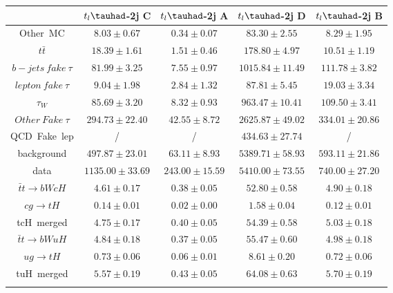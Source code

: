 \centering
\begin{tabular}{ccccc} \toprule\toprule
 & $t_{l}\tauhad$-2j C & $t_{l}\tauhad$-2j A & $t_{l}\tauhad$-2j D & $t_{l}\tauhad$-2j B\\\midrule
Other~MC & $8.03\pm0.67$ & $0.34\pm0.07$ & $83.30\pm2.55$ & $8.29\pm1.95$\\
$t\bar{t}$ & $18.39\pm1.61$ & $1.51\pm0.46$ & $178.80\pm4.97$ & $10.51\pm1.19$\\
$b-jets~fake~\tau$ & $81.99\pm3.25$ & $7.55\pm0.97$ & $1015.84\pm11.49$ & $111.78\pm3.82$\\
$lepton~fake~\tau$ & $9.04\pm1.98$ & $2.84\pm1.32$ & $87.81\pm5.45$ & $19.03\pm3.34$\\
$\tau_{W}$ & $85.69\pm3.20$ & $8.32\pm0.93$ & $963.47\pm10.41$ & $109.50\pm3.41$\\
$Other~Fake~\tau$ & $294.73\pm22.40$ & $42.55\pm8.72$ & $2625.87\pm49.02$ & $334.01\pm20.86$\\
QCD~Fake~lep &  / &  / & $434.63\pm27.74$ &  /\\
background & $497.87\pm23.01$ & $63.11\pm8.93$ & $5389.71\pm58.93$ & $593.11\pm21.86$\\
data & $1135.00\pm33.69$ & $243.00\pm15.59$ & $5410.00\pm73.55$ & $740.00\pm27.20$\\
$\bar{t}t\to bWcH$ & $4.61\pm0.17$ & $0.38\pm0.05$ & $52.80\pm0.58$ & $4.90\pm0.18$\\
$cg\to tH$ & $0.14\pm0.01$ & $0.02\pm0.00$ & $1.58\pm0.04$ & $0.12\pm0.01$\\
tcH~merged & $4.75\pm0.17$ & $0.40\pm0.05$ & $54.39\pm0.58$ & $5.03\pm0.18$\\
$\bar{t}t\to bWuH$ & $4.84\pm0.18$ & $0.37\pm0.05$ & $55.47\pm0.60$ & $4.98\pm0.18$\\
$ug\to tH$ & $0.73\pm0.06$ & $0.06\pm0.01$ & $8.61\pm0.20$ & $0.72\pm0.06$\\
tuH~merged & $5.57\pm0.19$ & $0.43\pm0.05$ & $64.08\pm0.63$ & $5.70\pm0.19$\\
\bottomrule\bottomrule\\
\end{tabular}

